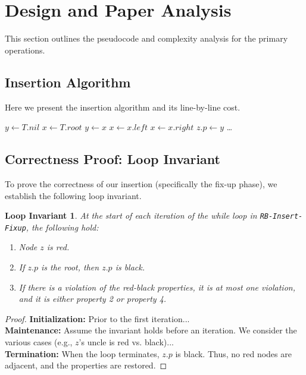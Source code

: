 \documentclass[11pt,a4paper]{article}
\newtheorem{invariant}{Loop Invariant}[section] %
\begin{document}
\section{Design and Paper Analysis}
This section outlines the pseudocode and complexity analysis for the primary operations.

\subsection{Insertion Algorithm}
Here we present the insertion algorithm and its line-by-line cost.

\begin{algorithm}
\caption{Red-Black Tree Insert(T, z)}\label{alg:rb_insert}
\begin{algorithmic}[1]
\State $y \gets T.nil$ 
\State $x \gets T.root$ 
 
    \State $y \gets x$
        \State $x \gets x.left$
    \Else
        \State $x \gets x.right$
    \EndIf
\EndWhile
\State $z.p \gets y$
\State \dots {}
\State {} 
\end{algorithmic}
\end{algorithm}

\subsection{Correctness Proof: Loop Invariant}
To prove the correctness of our insertion (specifically the fix-up phase), we establish the following loop invariant.

\begin{invariant}
At the start of each iteration of the while loop in \texttt{RB-Insert-Fixup}, the following hold:
\begin{enumerate}
    \item Node $z$ is red.
    \item If $z.p$ is the root, then $z.p$ is black.
    \item If there is a violation of the red-black properties, it is at most one violation, and it is either property 2 or property 4.
\end{enumerate}
\end{invariant}

\begin{proof}
\textbf{Initialization:} Prior to the first iteration... \\
\textbf{Maintenance:} Assume the invariant holds before an iteration. We consider the various cases (e.g., $z$'s uncle is red vs. black)... \\
\textbf{Termination:} When the loop terminates, $z.p$ is black. Thus, no red nodes are adjacent, and the properties are restored.
\end{proof}
\end{document}
